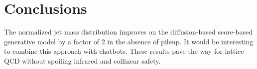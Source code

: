 \section{Conclusions}\label{sec:conclusions}

The normalized jet mass distribution improves on the diffusion-based
score-based generative model by a factor of 2 in the absence of pileup.
It would be interesting to combine this approach with chatbots. These
results pave the way for lattice QCD without spoiling infrared and
collinear safety.

